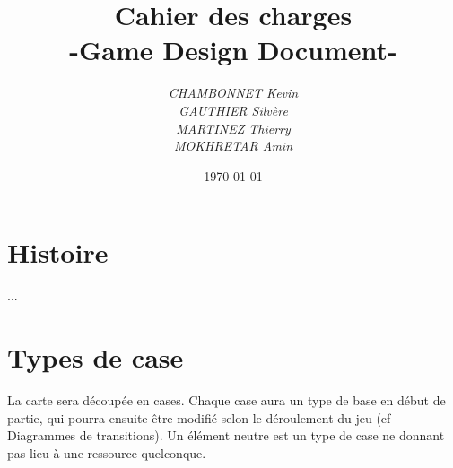 \documentclass[a4paper]{article}
\title{Cahier des charges\\-Game Design Document-}
\author{\emph{CHAMBONNET Kevin}\\\emph{GAUTHIER Silvère}\\\emph{MARTINEZ Thierry}\\\emph{MOKHRETAR Amin}}
\date{\today}
\begin{document}
\maketitle


\section*{Histoire}
...

\section*{Types de case}

La carte sera découpée en cases. Chaque case aura un type de base en début de partie, qui pourra ensuite être modifié selon le déroulement du jeu (cf Diagrammes de transitions). Un élément neutre est un type de case ne donnant pas lieu à une ressource quelconque.
\end{document}
